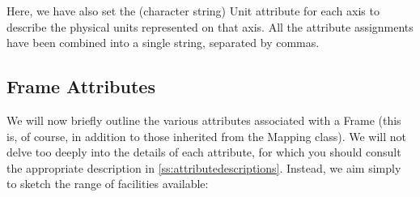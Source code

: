 \documentclass[twoside,11pt]{article}
\newcommand{\appref}[1]{Appendix~\ref{#1}}
\renewcommand{\appref}[1]{\ref{#1}}
\begin{document}
Here, we have also set the (character string) Unit attribute for each
axis to describe the physical units represented on that axis. All the
attribute assignments have been combined into a single string,
separated by commas.

\subsection{\label{ss:frameattributes}Frame Attributes}

We will now briefly outline the various attributes associated with a
Frame (this is, of course, in addition to those inherited from the
Mapping class). We will not delve too deeply into the details of each
attribute, for which you should consult the appropriate description in
\appref{ss:attributedescriptions}. Instead, we aim simply to sketch
the range of facilities available:
\end{document}
